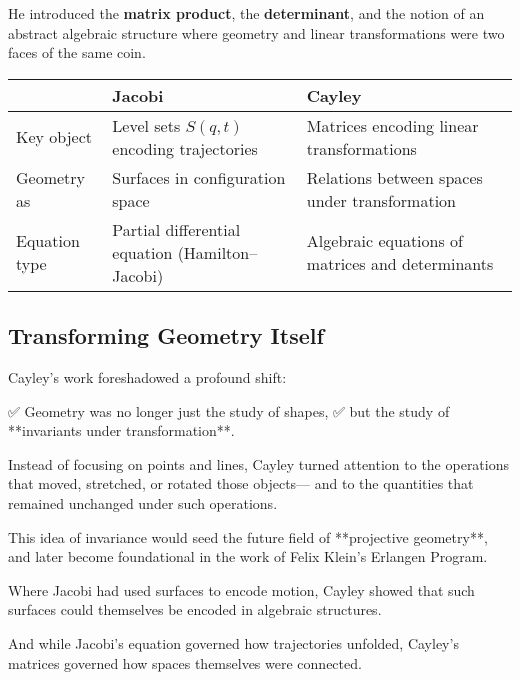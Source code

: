 He introduced the \textbf{matrix product}, the \textbf{determinant}, and the notion of an abstract algebraic structure  
where geometry and linear transformations were two faces of the same coin.

\bigskip

\begin{tcolorbox}[colback=gray!5!white, colframe=black, title=\textbf{Sidebar: The Shift from Jacobi to Cayley}, fonttitle=\bfseries, arc=1.5mm, boxrule=0.4pt]

\begin{tabular}{>{\raggedright}p{4cm} >{\raggedright}p{5.5cm} >{\raggedright\arraybackslash}p{5.5cm}}
 & \textbf{Jacobi} & \textbf{Cayley} \\
\midrule
Key object & Level sets \( S(q,t) \) encoding trajectories & Matrices encoding linear transformations \\
Geometry as & Surfaces in configuration space & Relations between spaces under transformation \\
Equation type & Partial differential equation (Hamilton–Jacobi) & Algebraic equations of matrices and determinants
\end{tabular}

\end{tcolorbox}

\bigskip

\subsection*{Transforming Geometry Itself}

Cayley’s work foreshadowed a profound shift:

✅ Geometry was no longer just the study of shapes,  
✅ but the study of **invariants under transformation**.

Instead of focusing on points and lines, Cayley turned attention to the operations that moved, stretched, or rotated those objects—  
and to the quantities that remained unchanged under such operations.

This idea of invariance would seed the future field of **projective geometry**,  
and later become foundational in the work of Felix Klein’s Erlangen Program.

\bigskip

Where Jacobi had used surfaces to encode motion,  
Cayley showed that such surfaces could themselves be encoded in algebraic structures.

And while Jacobi’s equation governed how trajectories unfolded,  
Cayley’s matrices governed how spaces themselves were connected.


